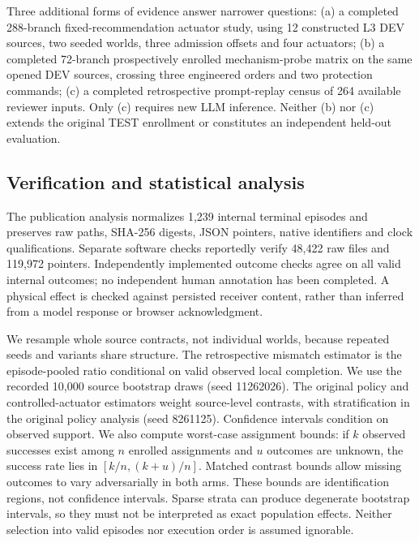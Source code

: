 \documentclass[10pt]{article}
\begin{document}
Three additional forms of evidence answer narrower questions: (a) a completed 288-branch fixed-recommendation actuator study, using 12 constructed L3 DEV sources, two seeded worlds, three admission offsets and four actuators; (b) a completed 72-branch prospectively enrolled mechanism-probe matrix on the same opened DEV sources, crossing three engineered orders and two protection commands; (c) a completed retrospective prompt-replay census of 264 available reviewer inputs. Only (c) requires new LLM inference. Neither (b) nor (c) extends the original TEST enrollment or constitutes an independent held-out evaluation.
\subsection{Verification and statistical analysis}
The publication analysis normalizes 1,239 internal terminal episodes and preserves raw paths, SHA-256 digests, JSON pointers, native identifiers and clock qualifications. Separate software checks reportedly verify 48,422 raw files and 119,972 pointers. Independently implemented outcome checks agree on all valid internal outcomes; no independent human annotation has been completed. A physical effect is checked against persisted receiver content, rather than inferred from a model response or browser acknowledgment.

We resample whole source contracts, not individual worlds, because repeated seeds and variants share structure. The retrospective mismatch estimator is the episode-pooled ratio conditional on valid observed local completion. We use the recorded 10,000 source bootstrap draws (seed 11262026). The original policy and controlled-actuator estimators weight source-level contrasts, with stratification in the original policy analysis (seed 8261125). Confidence intervals condition on observed support. We also compute worst-case assignment bounds: if $k$ observed successes exist among $n$ enrolled assignments and $u$ outcomes are unknown, the success rate lies in $[k/n,(k+u)/n]$. Matched contrast bounds allow missing outcomes to vary adversarially in both arms. These bounds are identification regions, not confidence intervals. Sparse strata can produce degenerate bootstrap intervals, so they must not be interpreted as exact population effects. Neither selection into valid episodes nor execution order is assumed ignorable.
\end{document}
